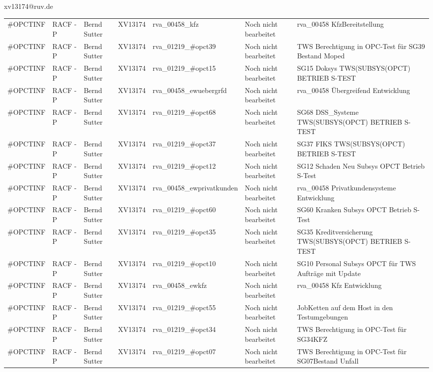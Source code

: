 \documentclass[a4paper,landscape,12pt]{letter}
\begin{document}
\begin{letter}{xv13174@ruv.de\hfill \break}
\begin{tiny}
\begin{longtable}{|p{35mm}|p{15mm}|p{25mm}|p{10mm}|p{40mm}|p{50mm}|p{50mm}|}
\#OPCTINF & RACF - P & Bernd Sutter & XV13174 & rva\_00458\_kfz & Noch nicht bearbeitet & rva\_00458 KfzBereitstellung \\
\#OPCTINF & RACF - P & Bernd Sutter & XV13174 & rva\_01219\_\#opct39 & Noch nicht bearbeitet & TWS Berechtigung in OPC-Test für SG39 Bestand Moped \\
\#OPCTINF & RACF - P & Bernd Sutter & XV13174 & rva\_01219\_\#opct15 & Noch nicht bearbeitet & SG15 Doksys TWS(SUBSYS(OPCT) BETRIEB S-TEST \\
\#OPCTINF & RACF - P & Bernd Sutter & XV13174 & rva\_00458\_ewuebergrfd & Noch nicht bearbeitet & rva\_00458 Übergreifend Entwicklung \\
\#OPCTINF & RACF - P & Bernd Sutter & XV13174 & rva\_01219\_\#opct68 & Noch nicht bearbeitet & SG68 DSS\_Systeme TWS(SUBSYS(OPCT) BETRIEB S-TEST \\
\#OPCTINF & RACF - P & Bernd Sutter & XV13174 & rva\_01219\_\#opct37 & Noch nicht bearbeitet & SG37 FIKS TWS(SUBSYS(OPCT) BETRIEB S-TEST \\
\#OPCTINF & RACF - P & Bernd Sutter & XV13174 & rva\_01219\_\#opct12 & Noch nicht bearbeitet & SG12 Schaden Neu Subsys OPCT Betrieb S-Test \\
\#OPCTINF & RACF - P & Bernd Sutter & XV13174 & rva\_00458\_ewprivatkunden & Noch nicht bearbeitet & rva\_00458 Privatkundensysteme Entwicklung \\
\#OPCTINF & RACF - P & Bernd Sutter & XV13174 & rva\_01219\_\#opct60 & Noch nicht bearbeitet & SG60 Kranken Subsys OPCT Betrieb S-Test \\
\#OPCTINF & RACF - P & Bernd Sutter & XV13174 & rva\_01219\_\#opct35 & Noch nicht bearbeitet & SG35 Kreditversicherung TWS(SUBSYS(OPCT) BETRIEB S-TEST \\
\#OPCTINF & RACF - P & Bernd Sutter & XV13174 & rva\_01219\_\#opct10 & Noch nicht bearbeitet & SG10 Personal Subsys OPCT für TWS Aufträge mit Update \\
\#OPCTINF & RACF - P & Bernd Sutter & XV13174 & rva\_00458\_ewkfz & Noch nicht bearbeitet & rva\_00458 Kfz Entwicklung \\
\#OPCTINF & RACF - P & Bernd Sutter & XV13174 & rva\_01219\_\#opct55 & Noch nicht bearbeitet & JobKetten auf dem Host in den Testumgebungen \\
\#OPCTINF & RACF - P & Bernd Sutter & XV13174 & rva\_01219\_\#opct34 & Noch nicht bearbeitet & TWS Berechtigung in OPC-Test für SG34KFZ \\
\#OPCTINF & RACF - P & Bernd Sutter & XV13174 & rva\_01219\_\#opct07 & Noch nicht bearbeitet & TWS Berechtigung in OPC-Test für SG07Bestand Unfall \\

\end{longtable}
\end{tiny}
\end{letter}
\end{document}
